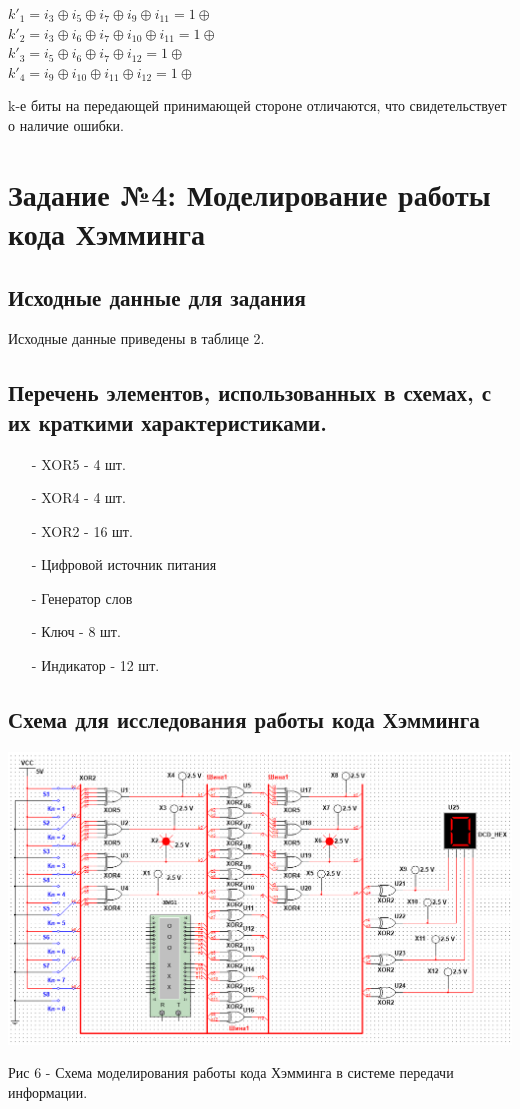 \documentclass[11pt]{article}
\begin{document}
$k'_1 = i_3 \oplus i_5 \oplus i_7 \oplus i_9 \oplus i_{11} = 1 \oplus$ \\

$k'_2 = i_3 \oplus i_6 \oplus i_7 \oplus i_{10} \oplus i_{11} = 1 \oplus$ \\

$k'_3 = i_5 \oplus i_6 \oplus i_7 \oplus i_{12} = 1 \oplus$ \\

$k'_4 = i_9 \oplus i_{10} \oplus i_{11} \oplus i_{12}= 1 \oplus$

k-е биты на передающей принимающей стороне отличаются, что
свидетельствует о наличие ошибки.

\newpage
\section{Задание №4: Моделирование работы кода Хэмминга}
\subsection{Исходные данные для задания}
Исходные данные приведены в таблице 2.
\subsection{Перечень элементов, использованных в схемах, с их краткими характеристиками.}
\begin{itemize}
    \item [-] XOR5 - 4 шт.
    \item [-] XOR4 - 4 шт.
    \item [-] XOR2 - 16 шт.
    \item [-] Цифровой источник питания
    \item [-] Генератор слов
    \item [-] Ключ - 8 шт.
    \item [-] Индикатор - 12 шт.
\end{itemize}
\subsection{Схема для исследования работы кода Хэмминга}
\includegraphics[width=1\linewidth]{img/scheme2.png}
\begin{center}
        Рис 6 - Схема моделирования работы кода Хэмминга в системе передачи информации.
\end{center}
\end{document}
